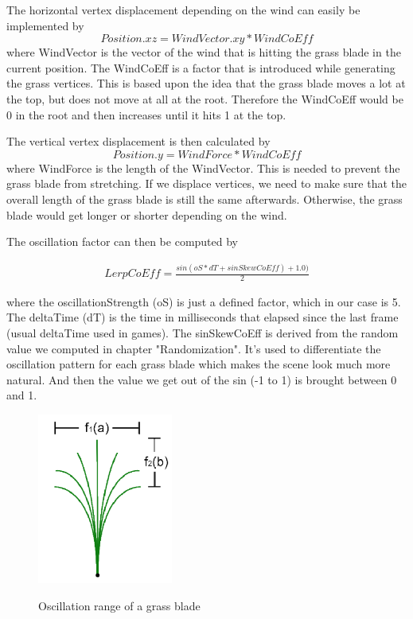 \documentclass[conference]{acmsiggraph}
\begin{document}
The horizontal vertex displacement depending on the wind can easily be implemented by
\begin{equation}
Position.xz = WindVector.xy * WindCoEff
\end{equation}
where WindVector is the vector of the wind that is hitting the grass blade in the current position. The WindCoEff is a factor that is introduced while generating the grass vertices. This is based upon the idea that the grass blade moves a lot at the top, but does not move at all at the root. Therefore the WindCoEff would be 0 in the root and then increases until it hits 1 at the top.

The vertical vertex displacement is then calculated by
\begin{equation}
Position.y = WindForce * WindCoEff
\end{equation}
where WindForce is the length of the WindVector. This is needed to prevent the grass blade from stretching. If we displace vertices, we need to make sure that the overall length of the grass blade is still the same afterwards. Otherwise, the grass blade would get longer or shorter depending on the wind.

The oscillation factor can then be computed by
\begin{center}
\begin{align*}
LerpCoEff = \frac{sin(oS * dT + sinSkewCoEff) + 1.0)}{2}
\end{align*}
\end{center}
where the oscillationStrength (oS) is just a defined factor, which in our case is 5. The deltaTime (dT) is the time in milliseconds that elapsed since the last frame (usual deltaTime used in games). The sinSkewCoEff is derived from the random value we computed in chapter "Randomization". It's used to differentiate the oscillation pattern for each grass blade which makes the scene look much more natural. And then the value we get out of the sin (-1 to 1) is brought between 0 and 1.

 \begin{figure}[ht]
   \centering
   \includegraphics[width=1.75in]{images/oscillation}
   \caption{Oscillation range of a grass blade} \cite{EddieLee}
 \end{figure}
\end{document}
